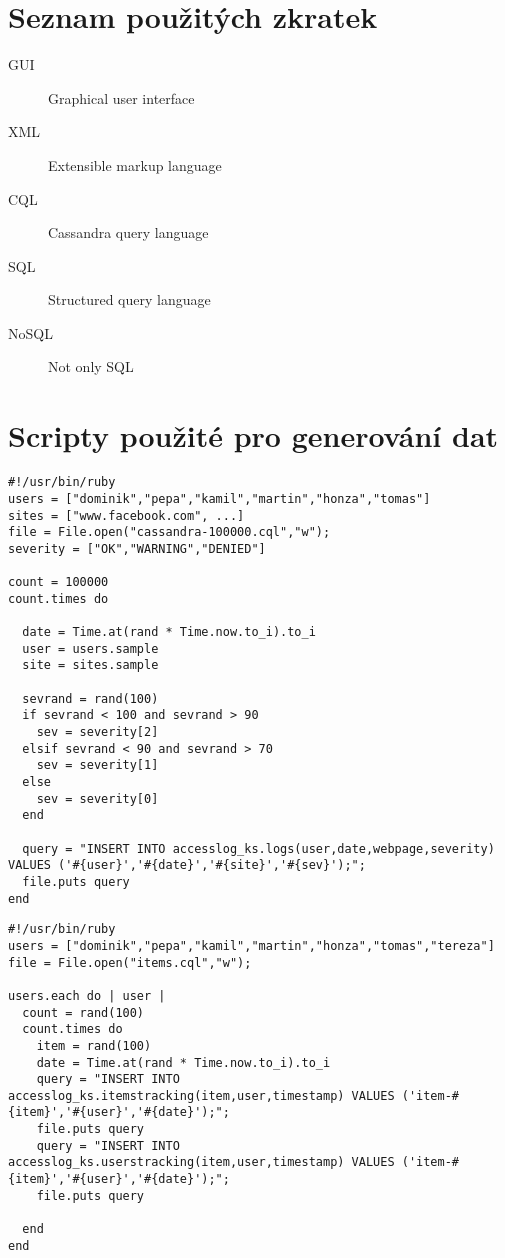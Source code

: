 \documentclass[thesis=M,czech]{FITthesis}[2012/06/26]
\begin{document}
\begin{conclusion}

\end{conclusion}

\nocite{*}



\appendix

\chapter{Seznam použitých zkratek}
\begin{description}
	\item[GUI] Graphical user interface
	\item[XML] Extensible markup language
	\item[CQL] Cassandra query language
	\item[SQL] Structured query language
	\item[NoSQL] Not only SQL
\end{description}

\chapter{Scripty použité pro generování dat}
\lstset{language=Ruby}          %
\begin{lstlisting}[caption={Generování přístupů z Access Logů},label=CQL3]
#!/usr/bin/ruby
users = ["dominik","pepa","kamil","martin","honza","tomas"]
sites = ["www.facebook.com", ...]
file = File.open("cassandra-100000.cql","w");
severity = ["OK","WARNING","DENIED"]

count = 100000
count.times do
  
  date = Time.at(rand * Time.now.to_i).to_i
  user = users.sample
  site = sites.sample
  
  sevrand = rand(100)
  if sevrand < 100 and sevrand > 90
    sev = severity[2]
  elsif sevrand < 90 and sevrand > 70
    sev = severity[1]
  else
    sev = severity[0]
  end
  
  query = "INSERT INTO accesslog_ks.logs(user,date,webpage,severity) VALUES ('#{user}','#{date}','#{site}','#{sev}');";
  file.puts query   
end
\end{lstlisting}
\pagebreak
\begin{lstlisting}[caption={Generování transakčních událostí},label=CQL3]
#!/usr/bin/ruby
users = ["dominik","pepa","kamil","martin","honza","tomas","tereza"]
file = File.open("items.cql","w");

users.each do | user |
  count = rand(100)
  count.times do
    item = rand(100)
    date = Time.at(rand * Time.now.to_i).to_i
    query = "INSERT INTO accesslog_ks.itemstracking(item,user,timestamp) VALUES ('item-#{item}','#{user}','#{date}');";
    file.puts query       
    query = "INSERT INTO accesslog_ks.userstracking(item,user,timestamp) VALUES ('item-#{item}','#{user}','#{date}');";
    file.puts query    
  
  end
end 
\end{lstlisting}
\end{document}
